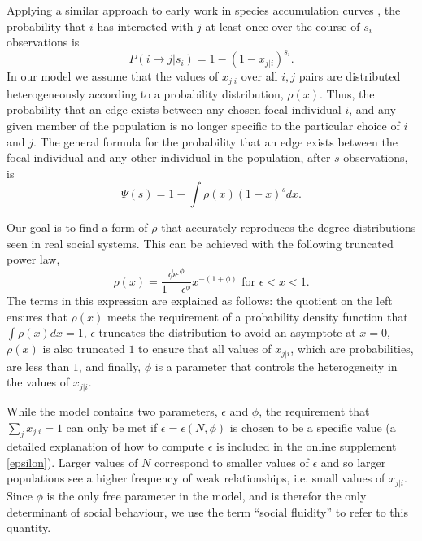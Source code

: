 \documentclass[10pt]{article}
\begin{document}
\begin{multicols}{2}
Applying a similar approach to early work in species accumulation curves \cite{arrhenius1921species}, the probability that $i$ has interacted with $j$ at least once over the course of $s_{i}$ observations is
\begin{equation}
\label{i_to_j}
P(i \rightarrow j|s_{i})=1-(1-x_{j|i})^{s_{i}}.
\end{equation}
In our model we assume that the values of $x_{j|i}$ over all $i,j$ pairs are distributed heterogeneously according to a probability distribution, $\rho(x)$. Thus, the probability that an edge exists between any chosen focal individual $i$, and any given member of the population is no longer specific to the particular choice of $i$ and $j$. The general formula for the probability that an edge exists between the focal individual and any other individual in the population, after $s$ observations, is 
\begin{equation}
\label{i_to_any}
\Psi(s)=1-\int\rho(x)(1-x)^{s}dx.
\end{equation}

Our goal is to find a form of $\rho$ that accurately reproduces the degree distributions seen in real social systems. This can be achieved with the following truncated power law,
\begin{equation}
\label{distribution}
\rho(x)=\frac{\phi\epsilon^{\phi}}{1-\epsilon^{\phi}}x^{-(1+\phi)} \text{ for } \epsilon<x<1.
\end{equation}
The terms in this expression are explained as follows: the quotient on the left ensures that $\rho(x)$ meets the requirement of a probability density function that $\int\rho(x)dx=1$, $\epsilon$ truncates the distribution to avoid an asymptote at $x=0$, $\rho(x)$ is also truncated $1$ to ensure that all values of $x_{j|i}$, which are probabilities, are less than $1$, and finally, $\phi$ is a parameter that controls the heterogeneity in the values of $x_{j|i}$. 

While the model contains two parameters, $\epsilon$ and $\phi$, the requirement that $\sum_{j}x_{j|i}=1$ can only be met if $\epsilon=\epsilon(N,\phi)$ is chosen to be a specific value (a detailed explanation of how to compute $\epsilon$ is included in the online supplement \ref{epsilon}). Larger values of $N$ correspond to smaller values of $\epsilon$ and so larger populations see a higher frequency of weak relationships, i.e. small values of $x_{j|i}$. Since $\phi$ is the only free parameter in the model, and is therefor the only determinant of social behaviour, we use the term ``social fluidity'' to refer to this quantity.  


\end{multicols}
\end{document}
